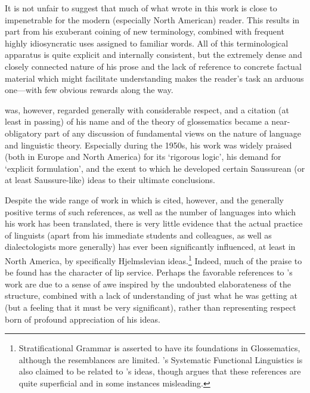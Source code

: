 It is not unfair to suggest that much of what {\Hjelmslev} wrote in this
work is close to impenetrable for the modern (especially North
American) reader. This results in part from his exuberant coining of
new terminology, combined with frequent highly idiosyncratic uses
assigned to familiar words. All of this terminological apparatus is
quite explicit and internally consistent, but the extremely dense and
closely connected nature of his prose and the lack of reference to
concrete factual material which might facilitate understanding makes
the reader's task an arduous one—with few obvious rewards along the
way.

{\Hjelmslev} was, however, regarded  generally with considerable
respect, and a citation (at least in passing) of his name and of the
theory of glossematics became a near-obligatory part of any
discussion of fundamental views on the nature of language and
linguistic theory. Especially during the 1950s, his work was widely
praised (both in Europe and North America) for its `rigorous logic',
his demand for `explicit formulation', and the exent to which he
developed certain Saussurean (or at least Saussure-like) ideas to
their ultimate conclusions.

Despite the wide range of work in which {\Hjelmslev} is cited, however,
and the generally positive terms of such references, as well as the
number of languages into which his work has been translated, there is
very little evidence that the actual practice of linguists (apart from
his immediate students and colleagues, as well as 
dialectologists more generally) has ever been significantly
influenced, at least in North America, by specifically Hjelmslevian
ideas.\footnote{
  Stratificational Grammar is asserted to have its foundations in
  Glossematics, although the resemblances are limited. 's Systematic Functional Linguistics is also claimed to be
  related to {\Hjelmslev}'s ideas, though
  \citet{bache10:halliday.hjelmslev} argues that these references are
  quite superficial and in some instances misleading.} Indeed, much of
the praise to be found has the character of lip service.  Perhaps the
favorable references to {\Hjelmslev}'s work are due to a sense of awe
inspired by the undoubted elaborateness of the structure, combined
with a lack of understanding of just what he was getting at (but a
feeling that it must be very significant), rather than representing
respect born of profound appreciation of his ideas.

